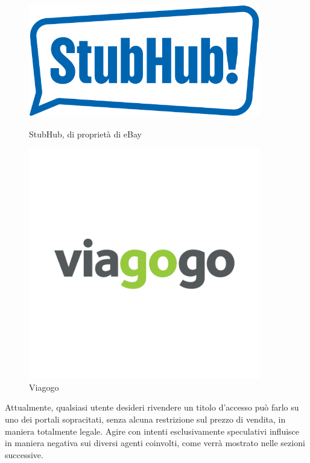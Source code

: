 \begin{figure}[H]
    \centering
    \begin{minipage}{0.45\textwidth}
        \centering
        \includegraphics[width=0.9\textwidth]{chapter2/immagini/StubHub} %
        \caption{StubHub, di proprietà di eBay}
				\label{stub}
    \end{minipage}\hfill
    \begin{minipage}{0.45\textwidth}
        \centering
        \includegraphics[width=0.9\textwidth]{chapter2/immagini/viagogo_logo_fb} %
        \caption{Viagogo}
				\label{viag}
    \end{minipage}
\end{figure}
Attualmente, qualsiasi utente desideri rivendere un titolo d'accesso può farlo su uno dei portali sopracitati, senza alcuna restrizione sul prezzo di vendita, in maniera totalmente legale. Agire con intenti esclusivamente speculativi influisce in maniera negativa sui diversi agenti coinvolti, come verrà mostrato nelle sezioni successive. 

